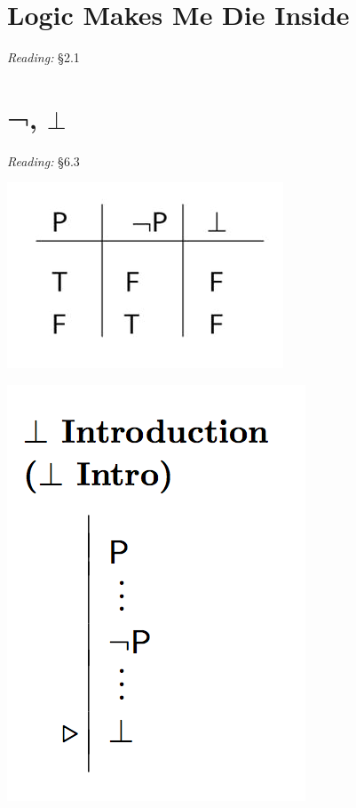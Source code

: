 \documentclass[12pt]{extarticle}
\begin{document}
\begin{multicols*}{3}
 
\section{Logic Makes Me Die Inside}
 
\emph{Reading:} §2.1
 
 
 
\section{¬, $\bot$}
 
\emph{Reading:} §6.3
 
\begin{center}
\includegraphics[scale=0.3]{img/tt_contradiction.png}
\end{center}
\begin{center}
\includegraphics[scale=0.3]{img/rule_contradiction_intro.png}
\end{center}

\end{multicols*}
\end{document}
